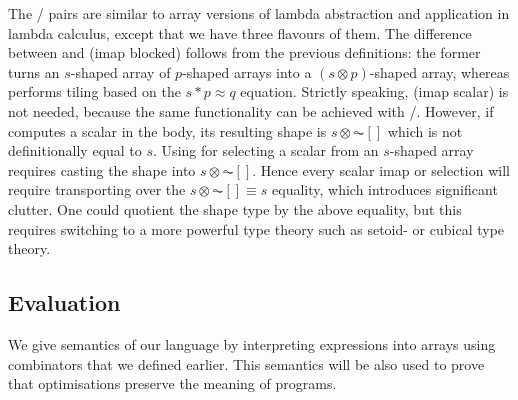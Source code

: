 The / pairs are similar to array versions of lambda
abstraction and application in lambda calculus, except that we
have three flavours of them.
The difference between  and  (imap blocked)
follows
from the previous definitions: the former turns an $s$-shaped array
of $p$-shaped arrays into a $(s ⊗ p)$-shaped array, whereas 
performs tiling based on the $s * p ≈ q$ equation.  Strictly speaking,
 (imap scalar) is not needed, because
the same functionality can be achieved with /.
However, if  computes a scalar in the body, its resulting shape 
is $s ⊗ \AC{[]}$ which is not definitionally equal to $s$.  Using
 for selecting a scalar from an $s$-shaped array requires
casting the shape into $s ⊗ \AC{[]}$.  Hence every scalar imap or
selection will require transporting over the $s ⊗ \AC{[]} ≡ s$ equality,
which introduces significant clutter.  One could quotient the shape
type by the above equality, but this requires switching to a more
powerful type theory such as setoid- or cubical type theory.




\subsection{Evaluation}

We give semantics of our language by interpreting  expressions
into  arrays using combinators that we defined earlier.  
This semantics will be also used to prove that optimisations preserve
the meaning of programs.

